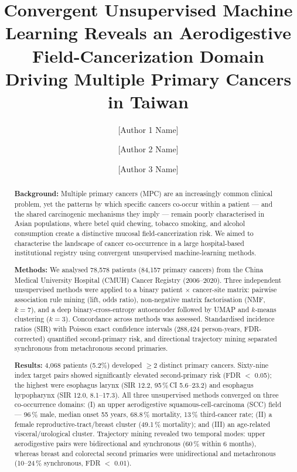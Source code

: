 \documentclass[review,12pt]{elsarticle}
\begin{document}
\begin{frontmatter}

\title{Convergent Unsupervised Machine Learning Reveals an Aerodigestive
  Field-Cancerization Domain Driving Multiple Primary Cancers in Taiwan}

\author[aff1]{[Author 1 Name]}
\author[aff1]{[Author 2 Name]}
\author[aff1,aff2]{[Author 3 Name]}

\address[aff1]{[Department of Oncology / Epidemiology], [Institution Name],
  [City], Taiwan}
\address[aff2]{[Second Affiliation, if applicable]}


\begin{abstract}
\textbf{Background:}
Multiple primary cancers (MPC) are an increasingly common clinical problem,
yet the patterns by which specific cancers co-occur within a patient --- and
the shared carcinogenic mechanisms they imply --- remain poorly characterised in
Asian populations, where betel quid chewing, tobacco smoking, and alcohol
consumption create a distinctive mucosal field-cancerization risk. We aimed to
characterise the landscape of cancer co-occurrence in a large hospital-based
institutional registry using convergent unsupervised machine-learning methods.

\textbf{Methods:}
We analysed 78,578 patients (84,157 primary cancers) from the China Medical
University Hospital (CMUH) Cancer Registry (2006--2020). Three independent unsupervised methods were applied to
a binary patient $\times$ cancer-site matrix: pairwise association rule mining
(lift, odds ratio), non-negative matrix factorisation (NMF, $k = 7$), and a
deep binary-cross-entropy autoencoder followed by UMAP and $k$-means clustering
($k = 3$). Concordance across methods was assessed. Standardised incidence
ratios (SIR) with Poisson exact confidence intervals (288,424 person-years,
FDR-corrected) quantified second-primary risk, and directional trajectory mining
separated synchronous from metachronous second primaries.

\textbf{Results:}
4,068 patients (5.2\%) developed $\geq$2 distinct primary cancers. Sixty-nine
index\,\textrightarrow\,target pairs showed significantly elevated second-primary
risk (FDR $<$ 0.05); the highest were esophagus\,\textrightarrow\,larynx
(SIR 12.2, 95\,\%\,CI 5.6--23.2) and esophagus\,\textrightarrow\,hypopharynx
(SIR 12.0, 8.1--17.3). All three unsupervised methods converged on three
co-occurrence domains: (I) an upper aerodigestive squamous-cell-carcinoma (SCC) field
--- 96\,\% male, median onset 55 years, 68.8\,\% mortality, 13\,\% third-cancer
rate; (II) a female reproductive-tract/breast cluster (49.1\,\% mortality); and
(III) an age-related visceral/urological cluster. Trajectory mining revealed two
temporal modes: upper aerodigestive pairs were bidirectional and synchronous (60\,\%
within 6 months), whereas breast and colorectal second primaries were
unidirectional and metachronous (10--24\,\% synchronous, FDR $<$ 0.01).


\end{abstract}
\end{frontmatter}
\end{document}
